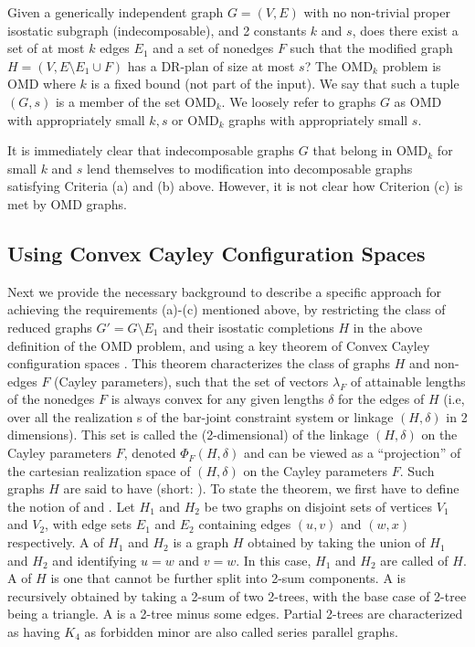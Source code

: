 Given a generically independent graph $G = (V,E)$ with no non-trivial
proper isostatic subgraph (indecomposable), and 2 constants $k$ and
$s$, does there exist a set of at most $k$  edges $E_1$ and a set of
nonedges $F$ such that the modified graph $H = (V, E\setminus E_1 \cup
F)$ has a DR-plan of size at most $s$?  The OMD$_k$ problem is  OMD
where $k$ is a fixed bound (not part of the input).   We say that such
a tuple $(G,s)$ is a member of the set OMD$_k$. We loosely refer to
graphs $G$ as OMD with appropriately small $k,s$ or OMD$_k$ graphs
with appropriately small $s$.


It is immediately clear that indecomposable graphs $G$ that belong in
OMD$_k$ for small $k$ and $s$  lend themselves to modification  into
decomposable graphs satisfying Criteria (a) and (b) above. However, it
is not clear how Criterion (c) is met by OMD graphs.
%
\subsection{Using Convex Cayley Configuration Spaces}
\label{sec:2-tree-reduction}
%
Next we provide the necessary background to describe a specific
approach for achieving the requirements (a)-(c) mentioned above, by
restricting the class of reduced graphs $G' = G\setminus E_1$ and
their isostatic completions $H$ in the above definition of the OMD
problem, and using a key theorem of Convex Cayley configuration spaces
\uncited. This theorem characterizes the class of graphs $H$ and non-
edges $F$ (Cayley parameters), such that the set of vectors
$\lambda_F$ of  attainable lengths of the nonedges $F$ is always
convex for any given lengths $\delta$ for the edges of $H$ (i.e, over
all the realization s of the bar-joint constraint system or linkage
$(H,\delta)$ in 2 dimensions). This set is called the (2-dimensional)
 of the linkage $(H,\delta)$ on the
Cayley parameters $F$, denoted $\Phi_F(H,\delta)$ and can be viewed as
a ``projection'' of the cartesian realization space of $(H,\delta)$ on
the Cayley parameters $F$. Such graphs $H$ are said to have
(short: ). To state the theorem, we first have to
define the notion of  and . Let $H_1$ and
$H_2$ be two graphs on disjoint sets of vertices $V_1$ and $V_2$, with
edge sets $E_1$ and $E_2$ containing edges $(u,v)$ and $(w,x)$
respectively.  A  of $H_1$ and $H_2$ is a graph $H$
obtained by taking the union of $H_1$ and $H_2$ and identifying $u=w$
and $v=w$. In this case, $H_1$ and $H_2$ are called  of $H$. A  of $H$ is  one
that cannot be further split into 2-sum components. A  is
recursively obtained by taking a 2-sum of two 2-trees, with the base
case of 2-tree being a triangle. A  is a 2-tree
minus some edges. Partial 2-trees are characterized as having $K_4$ as
forbidden minor are also called series parallel graphs.

